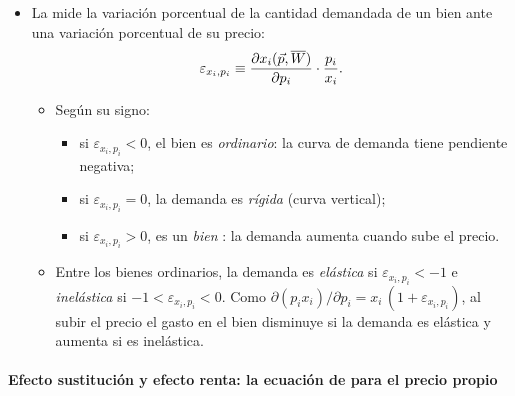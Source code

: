 \documentclass[11pt]{article}
\begin{document}
\begin{itemize}
\item La  mide la variación porcentual de la cantidad demandada de un bien ante una variación porcentual de su precio:
  \begin{equation}
  \varepsilon_{x_i,p_i}\equiv\frac{\partial x_i(\vec{p},\overline{W})}{\partial p_i}\cdot\frac{p_i}{x_i}. \label{eq:elasticidad-precio}
  \end{equation}
  \begin{itemize}
  \item Según su signo:
    \begin{itemize}
    \item si $\varepsilon_{x_i,p_i}<0$, el bien es \emph{ordinario}: la curva de demanda tiene pendiente negativa;
    \item si $\varepsilon_{x_i,p_i}=0$, la demanda es \emph{rígida} (curva vertical);
    \item si $\varepsilon_{x_i,p_i}>0$, es un \emph{bien }: la demanda aumenta cuando sube el precio.
    \end{itemize}
  \item Entre los bienes ordinarios, la demanda es \emph{elástica} si $\varepsilon_{x_i,p_i}<-1$ e \emph{inelástica} si $-1<\varepsilon_{x_i,p_i}<0$. Como $\partial(p_ix_i)/\partial p_i=x_i\,(1+\varepsilon_{x_i,p_i})$, al subir el precio el gasto en el bien disminuye si la demanda es elástica y aumenta si es inelástica.
  \end{itemize}
\end{itemize}

\paragraph{Efecto sustitución y efecto renta: la ecuación de  para el precio propio}
\end{document}
